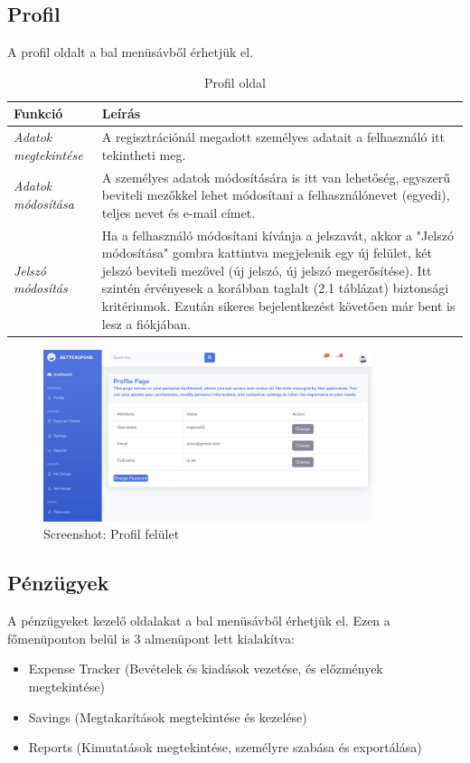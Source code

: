 \subsection{Profil}
A profil oldalt a bal menüsávből érhetjük el.
\begin{table}[H]
	\centering
	\begin{tabular}{ | m{} | m{} | }
		\hline
		\textbf{Funkció} & \textbf{Leírás} \\
		\hline \hline
		\emph{Adatok megtekintése} & A regisztrációnál megadott személyes adatait a felhasználó itt tekintheti meg. \\
		\hline
		\emph{Adatok módosítása} &  A személyes adatok módosítására is itt van lehetőség, egyszerű beviteli mezőkkel lehet módosítani a felhasználónevet (egyedi), teljes nevet és e-mail címet.  \\
		\hline
		\emph{Jelszó módosítás} & Ha a felhasználó módosítani kívánja a jelszavát, akkor a "Jelszó módosítása" gombra kattintva megjelenik egy új felület, két jelszó beviteli mezővel (új jelszó, új jelszó megerősítése). Itt szintén érvényesek a korábban taglalt (2.1 táblázat) biztonsági kritériumok. Ezután sikeres bejelentkezést követően már bent is lesz a fiókjában. \\
		\hline
	\end{tabular}
	\caption{Profil oldal}
	\label{tab:profile}
\end{table}

\begin{figure}[H]
	\centering
	\includegraphics[height=190px]{img/profile-screenshot}
	\caption{Screenshot: Profil felület}
	\label{fig:profile}
\end{figure}

\subsection{Pénzügyek}
A pénzügyeket kezelő oldalakat a bal menüsávből érhetjük el. Ezen a főmenüponton belül is 3 almenüpont lett kialakítva: 
\begin{itemize}
	\item Expense Tracker (Bevételek és kiadások vezetése, és előzmények megtekintése)
	\item Savings (Megtakarítások megtekintése és kezelése)
	\item Reports (Kimutatások megtekintése, személyre szabása és exportálása)
\end{itemize}

